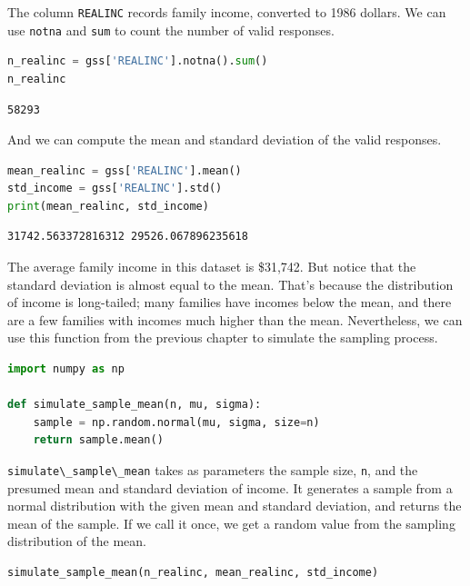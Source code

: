 The column \passthrough{\lstinline!REALINC!} records family income,
converted to 1986 dollars. We can use \passthrough{\lstinline!notna!}
and \passthrough{\lstinline!sum!} to count the number of valid
responses.

\begin{lstlisting}[language=Python,style=source]
n_realinc = gss['REALINC'].notna().sum()
n_realinc
\end{lstlisting}

\begin{lstlisting}[style=output]
58293
\end{lstlisting}

And we can compute the mean and standard deviation of the valid
responses.

\begin{lstlisting}[language=Python,style=source]
mean_realinc = gss['REALINC'].mean()
std_income = gss['REALINC'].std()
print(mean_realinc, std_income)
\end{lstlisting}

\begin{lstlisting}[style=output]
31742.563372816312 29526.067896235618
\end{lstlisting}

The average family income in this dataset is \$31,742. But notice that
the standard deviation is almost equal to the mean. That's because the
distribution of income is long-tailed; many families have incomes below
the mean, and there are a few families with incomes much higher than the
mean. Nevertheless, we can use this function from the previous chapter
to simulate the sampling process.

\begin{lstlisting}[language=Python,style=source]
import numpy as np

def simulate_sample_mean(n, mu, sigma):
    sample = np.random.normal(mu, sigma, size=n)
    return sample.mean()
\end{lstlisting}

\passthrough{\lstinline!simulate\_sample\_mean!} takes as parameters the
sample size, \passthrough{\lstinline!n!}, and the presumed mean and
standard deviation of income. It generates a sample from a normal
distribution with the given mean and standard deviation, and returns the
mean of the sample. If we call it once, we get a random value from the
sampling distribution of the mean.

\begin{lstlisting}[language=Python,style=source]
simulate_sample_mean(n_realinc, mean_realinc, std_income)
\end{lstlisting}

